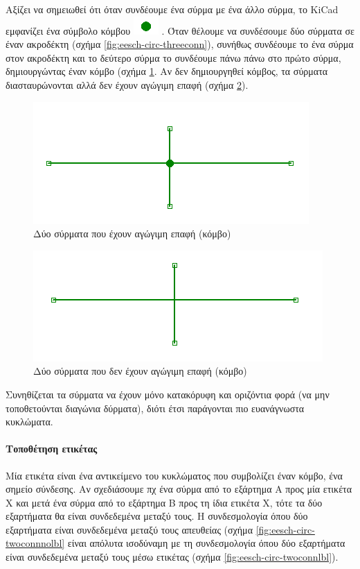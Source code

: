 \documentclass[a4paper]{article}
\begin{document}
Αξίζει να σημειωθεί ότι όταν συνδέουμε ένα σύρμα με ένα άλλο σύρμα, το \textenglish{KiCad} εμφανίζει ένα σύμβολο κόμβου \includegraphics[scale=.5]{img/eesch-ico-junc.png}
. Όταν θέλουμε να συνδέσουμε δύο σύρματα σε έναν ακροδέκτη (σχήμα \ref{fig:eesch-circ-threeconn}), συνήθως συνδέουμε το ένα σύρμα στον ακροδέκτη και το δεύτερο σύρμα το συνδέουμε πάνω πάνω στο πρώτο σύρμα, δημιουργώντας έναν κόμβο (σχήμα \ref{fig:eesch-circ-twowireconn}. Αν δεν δημιουργηθεί κόμβος, τα σύρματα διασταυρώνονται αλλά δεν έχουν αγώγιμη επαφή (σχήμα \ref{fig:eesch-circ-twowirenoconn}).

\begin{figure}
  \begin{center}
    \includegraphics[width=.35\textwidth]{img/eesch-circ-twowireconn.png}
    \caption{Δύο σύρματα που έχουν αγώγιμη επαφή (κόμβο)}
    \label{fig:eesch-circ-twowireconn}
  \end{center}
\end{figure}

\begin{figure}
  \begin{center}
    \includegraphics[width=.35\textwidth]{img/eesch-circ-twowirenoconn.png}
    \caption{Δύο σύρματα που δεν έχουν αγώγιμη επαφή (κόμβο)}
    \label{fig:eesch-circ-twowirenoconn}
  \end{center}
\end{figure}

Συνηθίζεται τα σύρματα να έχουν μόνο κατακόρυφη και οριζόντια φορά (να μην τοποθετούνται διαγώνια δύρματα), διότι έτσι παράγονται πιο ευανάγνωστα κυκλώματα.

\paragraph{Τοποθέτηση ετικέτας}
Μία ετικέτα είναι ένα αντικείμενο του κυκλώματος που συμβολίζει έναν κόμβο, ένα σημείο σύνδεσης. Αν σχεδιάσουμε πχ ένα σύρμα από το εξάρτημα Α προς μία ετικέτα Χ και μετά ένα σύρμα από το εξάρτημα Β προς τη ίδια ετικέτα Χ, τότε τα δύο εξαρτήματα θα είναι συνδεδεμένα μεταξύ τους. Η συνδεσμολογία όπου δύο εξαρτήματα είναι συνδεδεμένα μεταξύ τους απευθείας (σχήμα \ref{fig:eesch-circ-twoconnnolbl} είναι απόλυτα ισοδύναμη με τη συνδεσμολογία όπου δύο εξαρτήματα είναι συνδεδεμένα μεταξύ τους μέσω ετικέτας (σχήμα \ref{fig:eesch-circ-twoconnlbl}).
\end{document}
